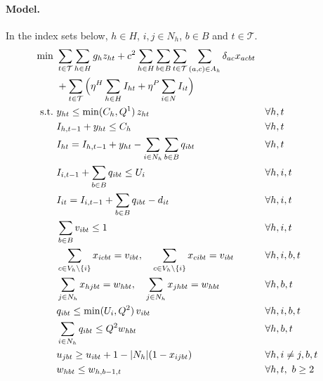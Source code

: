\documentclass[11pt,a4paper]{article}
\begin{document}
\paragraph{Model.}
In the index sets below, $h \in H$, $i, j \in N_h$, $b \in B$ and $t \in \mathcal{T}$.
\begin{align}
\min\ & \sum_{t \in \mathcal{T}} \sum_{h \in H} g_h z_{ht}
  + c^2 \sum_{h \in H} \sum_{b \in B} \sum_{t \in \mathcal{T}} \sum_{(a,c) \in A_h}
    \delta_{ac} x_{acbt} \notag\\
  & + \sum_{t \in \mathcal{T}} \Big( \eta^H \sum_{h \in H} I_{ht}
    + \eta^P \sum_{i \in N} I_{it} \Big) \label{eq:obj}\\
\text{s.t.}\ & y_{ht} \le \min(C_h, Q^1)\, z_{ht} && \forall h, t \label{eq:trip}\\
& I_{h,t-1} + y_{ht} \le C_h && \forall h, t \label{eq:hubmax}\\
& I_{ht} = I_{h,t-1} + y_{ht} - \sum_{i \in N_h} \sum_{b \in B} q_{ibt}
  && \forall h, t \label{eq:hubbal}\\
& I_{i,t-1} + \sum_{b \in B} q_{ibt} \le U_i && \forall h, i, t \label{eq:pointmax}\\
& I_{it} = I_{i,t-1} + \sum_{b \in B} q_{ibt} - d_{it} && \forall h, i, t \label{eq:pointbal}\\
& \sum_{b \in B} v_{ibt} \le 1 && \forall h, i, t \label{eq:onevan}\\
& \sum_{c \in V_h \setminus \{i\}} x_{icbt} = v_{ibt},\quad
  \sum_{c \in V_h \setminus \{i\}} x_{cibt} = v_{ibt} && \forall h, i, b, t \label{eq:degree}\\
& \sum_{j \in N_h} x_{hjbt} = w_{hbt},\quad \sum_{j \in N_h} x_{jhbt} = w_{hbt}
  && \forall h, b, t \label{eq:depot}\\
& q_{ibt} \le \min(U_i, Q^2)\, v_{ibt} && \forall h, i, b, t \label{eq:visitq}\\
& \sum_{i \in N_h} q_{ibt} \le Q^2 w_{hbt} && \forall h, b, t \label{eq:vancap}\\
& u_{jbt} \ge u_{ibt} + 1 - |N_h| (1 - x_{ijbt}) && \forall h, i \ne j, b, t \label{eq:mtz}\\
& w_{hbt} \le w_{h,b-1,t} && \forall h, t,\ b \ge 2 \label{eq:sym}
\end{align}
\end{document}
